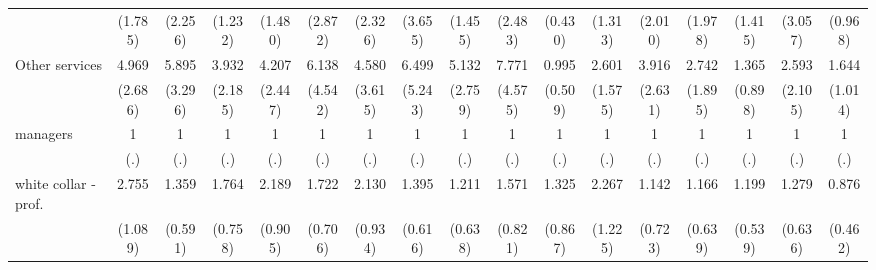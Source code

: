 {\begin{tabular}{l*{16}{c}}
                    &     (1.785)         &     (2.256)         &     (1.232)         &     (1.480)         &     (2.872)         &     (2.326)         &     (3.655)         &     (1.455)         &     (2.483)         &     (0.430)         &     (1.313)         &     (2.010)         &     (1.978)         &     (1.415)         &     (3.057)         &     (0.968)         \\
[1em]
Other services      &       4.969\sym{**} &       5.895\sym{**} &       3.932\sym{*}  &       4.207\sym{*}  &       6.138\sym{*}  &       4.580         &       6.499\sym{*}  &       5.132\sym{**} &       7.771\sym{***}&       0.995         &       2.601         &       3.916\sym{*}  &       2.742         &       1.365         &       2.593         &       1.644         \\
                    &     (2.686)         &     (3.296)         &     (2.185)         &     (2.447)         &     (4.542)         &     (3.615)         &     (5.243)         &     (2.759)         &     (4.575)         &     (0.509)         &     (1.575)         &     (2.631)         &     (1.895)         &     (0.898)         &     (2.105)         &     (1.014)         \\
[1em]
managers            &           1         &           1         &           1         &           1         &           1         &           1         &           1         &           1         &           1         &           1         &           1         &           1         &           1         &           1         &           1         &           1         \\
                    &         (.)         &         (.)         &         (.)         &         (.)         &         (.)         &         (.)         &         (.)         &         (.)         &         (.)         &         (.)         &         (.)         &         (.)         &         (.)         &         (.)         &         (.)         &         (.)         \\
[1em]
white collar - prof.&       2.755\sym{*}  &       1.359         &       1.764         &       2.189         &       1.722         &       2.130         &       1.395         &       1.211         &       1.571         &       1.325         &       2.267         &       1.142         &       1.166         &       1.199         &       1.279         &       0.876         \\
                    &     (1.089)         &     (0.591)         &     (0.758)         &     (0.905)         &     (0.706)         &     (0.934)         &     (0.616)         &     (0.638)         &     (0.821)         &     (0.867)         &     (1.225)         &     (0.723)         &     (0.639)         &     (0.539)         &     (0.636)         &     (0.462)         \\

\end{tabular}}
